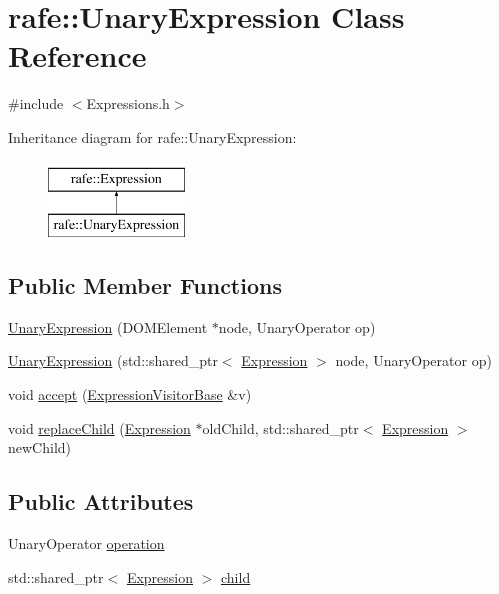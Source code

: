 \hypertarget{classrafe_1_1_unary_expression}{\section{rafe\+:\+:Unary\+Expression Class Reference}
\label{classrafe_1_1_unary_expression}
}


{\ttfamily \#include $<$Expressions.\+h$>$}

Inheritance diagram for rafe\+:\+:Unary\+Expression\+:\begin{figure}[H]
\begin{center}
\leavevmode
\includegraphics[height=2.000000cm]{classrafe_1_1_unary_expression}
\end{center}
\end{figure}
\subsection*{Public Member Functions}
\begin{DoxyCompactItemize}
\item 
\hyperlink{classrafe_1_1_unary_expression_ad2440e66133fa32af4fc4a25606890df}{Unary\+Expression} (D\+O\+M\+Element $\ast$node, Unary\+Operator op)
\item 
\hyperlink{classrafe_1_1_unary_expression_abf627e7d906dece74f1e30df756fba29}{Unary\+Expression} (std\+::shared\+\_\+ptr$<$ \hyperlink{classrafe_1_1_expression}{Expression} $>$ node, Unary\+Operator op)
\item 
void \hyperlink{classrafe_1_1_unary_expression_a04214cead0edc977169fa157fc8d13e7}{accept} (\hyperlink{classrafe_1_1_expression_visitor_base}{Expression\+Visitor\+Base} \&v)
\item 
void \hyperlink{classrafe_1_1_unary_expression_adef2ed922c3a5d6248469dc6e0b78842}{replace\+Child} (\hyperlink{classrafe_1_1_expression}{Expression} $\ast$old\+Child, std\+::shared\+\_\+ptr$<$ \hyperlink{classrafe_1_1_expression}{Expression} $>$ new\+Child)
\end{DoxyCompactItemize}
\subsection*{Public Attributes}
\begin{DoxyCompactItemize}
\item 
Unary\+Operator \hyperlink{classrafe_1_1_unary_expression_ac27d8c32f42597d66a2a59cf606d49b6}{operation}
\item 
std\+::shared\+\_\+ptr$<$ \hyperlink{classrafe_1_1_expression}{Expression} $>$ \hyperlink{classrafe_1_1_unary_expression_aba41338159e0516aa56d0017fc221210}{child}
\end{DoxyCompactItemize}
